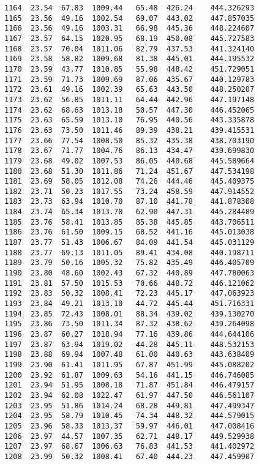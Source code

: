\documentclass[11pt]{article}
\begin{document}
\begin{tcolorbox}[breakable, size=fbox, boxrule=.5pt, pad at break*=1mm, opacityfill=0]
\begin{Verbatim}[commandchars=\\\{\}]
1164  23.54  67.83  1009.44   65.48  426.24    444.326293
1165  23.56  49.16  1002.54   69.07  443.02    447.857035
1166  23.56  49.16  1003.31   66.98  445.36    448.224607
1167  23.57  64.15  1020.95   68.19  450.08    445.727583
1168  23.57  70.04  1011.06   82.79  437.53    441.324140
1169  23.58  58.82  1009.68   81.38  445.01    444.195532
1170  23.59  43.77  1010.85   55.98  448.42    451.729051
1171  23.59  71.73  1009.69   87.06  435.67    440.129783
1172  23.61  49.16  1002.39   65.63  443.50    448.250207
1173  23.62  56.85  1011.11   64.44  442.96    447.197148
1174  23.62  68.63  1013.18   50.57  447.30    446.452065
1175  23.63  65.59  1013.10   76.95  440.56    443.335878
1176  23.63  73.50  1011.46   89.39  438.21    439.415531
1177  23.66  77.54  1008.50   85.32  435.38    438.703190
1178  23.67  71.77  1004.76   86.13  434.47    439.699830
1179  23.68  49.02  1007.53   86.05  440.68    445.589664
1180  23.68  51.30  1011.86   71.24  451.67    447.534198
1181  23.69  58.05  1012.08   74.26  444.46    445.409375
1182  23.71  50.23  1017.55   73.24  458.59    447.914552
1183  23.73  63.94  1010.70   87.10  441.78    441.878308
1184  23.74  65.34  1013.70   62.90  447.31    445.284489
1185  23.76  58.41  1013.85   85.38  445.85    443.706511
1186  23.76  61.50  1009.15   68.52  441.16    445.013038
1187  23.77  51.43  1006.67   84.09  441.54    445.031129
1188  23.77  69.13  1011.05   89.41  434.08    440.198711
1189  23.79  50.16  1005.32   75.82  435.49    446.405709
1190  23.80  48.60  1002.43   67.32  440.89    447.780063
1191  23.81  57.50  1015.53   70.66  448.72    446.121062
1192  23.83  50.32  1008.41   72.23  445.17    447.063923
1193  23.84  49.21  1013.10   44.72  445.44    451.716331
1194  23.85  72.43  1008.01   88.34  439.02    439.130270
1195  23.86  73.50  1011.34   87.32  438.62    439.264098
1196  23.87  60.27  1018.94   77.16  439.86    444.644106
1197  23.87  63.94  1019.02   44.28  445.11    448.532153
1198  23.88  69.94  1007.48   61.00  440.63    443.638409
1199  23.90  61.41  1011.95   67.87  451.99    445.088202
1200  23.92  61.87  1009.63   54.16  441.15    446.746085
1201  23.94  51.95  1008.18   71.87  451.84    446.479157
1202  23.94  62.08  1022.47   61.97  447.50    446.561107
1203  23.95  51.86  1014.24   68.28  449.81    447.499347
1204  23.95  58.79  1010.45   74.34  448.32    444.579015
1205  23.96  58.33  1013.37   59.97  446.01    447.008416
1206  23.97  44.57  1007.35   62.71  448.17    449.529938
1207  23.97  68.67  1006.63   76.83  441.53    441.402972
1208  23.99  50.32  1008.41   67.40  444.23    447.459907

\end{Verbatim}
\end{tcolorbox}
\end{document}
